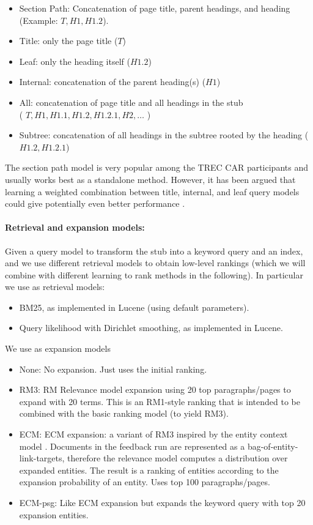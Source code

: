 \documentclass{article}
\begin{document}
\begin{itemize}
    \item Section Path: Concatenation of page title, parent headings, and heading (Example: $T, H1, H1.2$).
    \item Title: only the page title ($T$)
    \item Leaf: only the heading itself ($H1.2$)
    \item Internal: concatenation of the parent heading(s) ($H1$)
    \item All: concatenation of page title and all headings in the stub \\ ( $T, H1, H1.1, H1.2, H1.2.1, H2, \dots$ )
    \item Subtree: concatenation of all headings in the subtree rooted by the heading ($H1.2, H1.2.1$)
\end{itemize}

The section path model is very popular among the TREC CAR participants and usually works best as a standalone method. However, it has been argued that learning a weighted combination between title, internal, and leaf query models could give potentially even better performance \cite{macavaney2018overcoming}.


\paragraph{Retrieval and expansion models:}

Given a query model to transform the stub into a keyword query and an index, and we  use different retrieval models to obtain low-level rankings (which we will combine with different learning to rank methods in the following). In particular we use as retrieval models:

\begin{itemize}
    \item BM25, as implemented in Lucene (using default parameters).
    \item Query likelihood with Dirichlet smoothing, as implemented in Lucene.
\end{itemize}

We use as expansion models    
\begin{itemize}
    \item None: No expansion. Just uses the initial ranking.
    \item RM3: RM Relevance model expansion \cite{lavrenko2017relevance} using 20 top paragraphs/pages to expand with 20 terms. This is an RM1-style ranking that is intended to be combined with the basic ranking model (to yield RM3).
    \item ECM: ECM expansion: a variant of RM3 inspired by the entity context model \cite{dalton2014entity}. Documents in the feedback run are represented as a bag-of-entity-link-targets, therefore the relevance model computes a distribution over expanded entities. The result is a ranking of entities according to the expansion probability of an entity. Uses top 100 paragraphs/pages.
    \item ECM-psg: Like ECM expansion but expands the keyword query with top 20 expansion entities.
\end{itemize}
\end{document}
